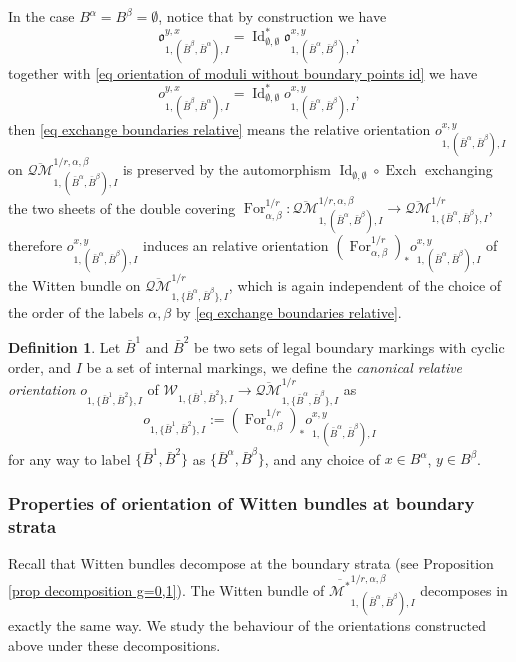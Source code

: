 \documentclass[11pt,a4paper]{article}
\theoremstyle{definition}
\newtheorem{dfn}[dummy]{Definition}
\theoremstyle{remark}
\numberwithin{equation}{section}
\DeclareMathOperator{\Id}{Id}
\def\Mbarstar{{\overline{\mathcal M^*}}}
\begin{document}
In the case $B^\alpha=B^\beta=\emptyset$, notice that by construction we have 
$$
{\mathfrak o}^{y,x}_{1,(\bar B^\beta, \bar B^\alpha ),I}=\Id_{\emptyset,\emptyset}^*{\mathfrak o}^{x,y}_{1,(\bar B^\alpha, \bar B^\beta ),I},
$$
together with \eqref{eq orientation of moduli without boundary points id} we have 
$$
{ o}^{y,x}_{1,(\bar B^\beta, \bar B^\alpha ),I}=\Id_{\emptyset,\emptyset}^*{o}^{x,y}_{1,(\bar B^\alpha, \bar B^\beta ),I},
$$
then \eqref{eq exchange boundaries relative} means the relative orientation   ${o}^{x,y}_{1,(\bar B^\alpha, \bar B^\beta ),I}$ on $\overline {\mathcal {QM}}^{1/r,\alpha,\beta}_{1,(\bar B^\alpha, \bar B^\beta ),I}$ is preserved by the automorphism $\Id_{\emptyset,\emptyset}\circ \operatorname{Exch}$ exchanging the two sheets of the double covering $\operatorname{For}_{\alpha,\beta}^{1/r} \colon \overline {\mathcal {QM}}^{1/r,\alpha,\beta}_{1,(\bar B^\alpha, \bar B^\beta ),I} \to \overline {\mathcal {QM}}^{1/r}_{1,\{\bar B^\alpha, \bar B^\beta \},I}$, therefore ${ o}^{x,y}_{1,(\bar B^\alpha, \bar B^\beta ),I}$ induces an relative orientation $(\operatorname{For}_{\alpha,\beta}^{1/r})_* { o}^{x,y}_{1,(\bar B^\alpha, \bar B^\beta ),I}$ of the Witten bundle on $ \overline {\mathcal {QM}}^{1/r}_{1,\{\bar B^\alpha, \bar B^\beta \},I}$, which is again independent of the choice of the order of the labels $\alpha,\beta$ by \eqref{eq exchange boundaries relative}.

\begin{dfn}
    Let $\bar B^1$ and $\bar B^2$ be two sets of legal boundary markings with cyclic order, and $I$ be a set of internal markings, we define the \textit{canonical relative orientation} ${ o}^{}_{1,\{\bar B^1, \bar B^2 \},I}$ of $\mathcal W_{1,\{\bar B^1, \bar B^2 \},I}\to \overline {\mathcal {QM}}^{1/r}_{1,\{\bar B^\alpha, \bar B^\beta \},I}$ as 
    $$
    { o}^{}_{1,\{\bar B^1, \bar B^2 \},I}:=(\operatorname{For}_{\alpha,\beta}^{1/r})_* { o}^{x,y}_{1,(\bar B^\alpha, \bar B^\beta ),I} 
    $$
    for any way to label $\{\bar B^1,\bar B^2\}$ as $\{\bar B^\alpha, \bar B^\beta\}$, and any choice of $x\in B^\alpha$, $y\in B^\beta$.



\end{dfn}

  

\subsubsection{Properties of orientation of Witten bundles at boundary strata}
Recall that Witten bundles decompose at the boundary strata (see Proposition \ref{prop decomposition g=0,1}). {The Witten bundle of $\Mbarstar^{1/r,\alpha,\beta}_{1,(\bar{B}^\alpha,\bar{B}^\beta),I}$ decomposes in exactly the same way.} We study the behaviour of the orientations constructed above under these decompositions.
\end{document}
